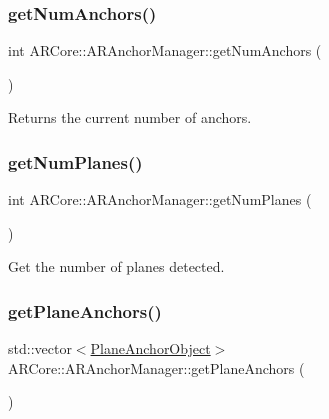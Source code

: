 \subsubsection{\texorpdfstring{get\+Num\+Anchors()}{getNumAnchors()}}
{\footnotesize\ttfamily int A\+R\+Core\+::\+A\+R\+Anchor\+Manager\+::get\+Num\+Anchors (\begin{DoxyParamCaption}{ }\end{DoxyParamCaption})\hspace{0.3cm}{\ttfamily [inline]}}



Returns the current number of anchors. 

\mbox{\label{class_a_r_core_1_1_a_r_anchor_manager_a1da3445edbf4474d1207d30b691cfb4f}} 
\subsubsection{\texorpdfstring{get\+Num\+Planes()}{getNumPlanes()}}
{\footnotesize\ttfamily int A\+R\+Core\+::\+A\+R\+Anchor\+Manager\+::get\+Num\+Planes (\begin{DoxyParamCaption}{ }\end{DoxyParamCaption})}



Get the number of planes detected. 

\mbox{\label{class_a_r_core_1_1_a_r_anchor_manager_a46a02253729234aef5617512f48e9211}} 
\subsubsection{\texorpdfstring{get\+Plane\+Anchors()}{getPlaneAnchors()}}
{\footnotesize\ttfamily std\+::vector$<$\hyperlink{struct_a_r_objects_1_1_plane_anchor_object}{Plane\+Anchor\+Object}$>$ A\+R\+Core\+::\+A\+R\+Anchor\+Manager\+::get\+Plane\+Anchors (\begin{DoxyParamCaption}{ }\end{DoxyParamCaption})\hspace{0.3cm}{\ttfamily [inline]}}



